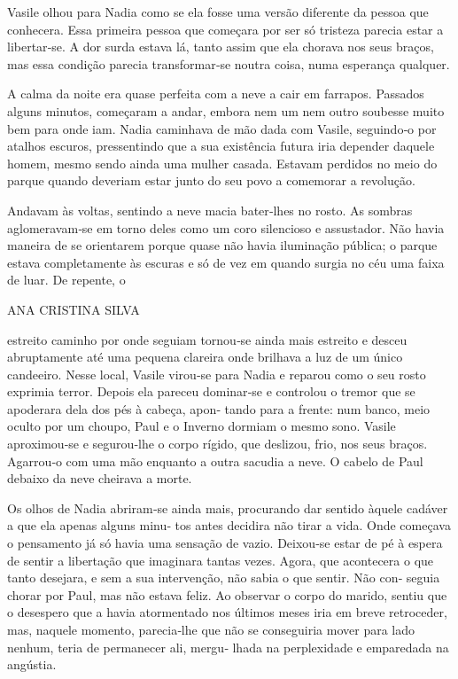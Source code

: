 Vasile olhou para Nadia como se ela fosse uma versão diferente da pessoa
que conhecera. Essa primeira pessoa que começara por ser só tristeza
parecia estar a libertar‑se. A dor surda estava lá, tanto assim que ela
chorava nos seus braços, mas essa condição parecia transformar‑se noutra
coisa, numa esperança qualquer.

A calma da noite era quase perfeita com a neve a cair em farrapos.
Passados alguns minutos, começaram a andar, embora nem um nem outro
soubesse muito bem para onde iam. Nadia caminhava de mão dada com
Vasile, seguindo‑o por atalhos escuros, pressentindo que a sua
existência futura iria depender daquele homem, mesmo sendo ainda uma
mulher casada. Estavam perdidos no meio do parque quando deveriam estar
junto do seu povo a comemorar a revolução.

Andavam às voltas, sentindo a neve macia bater‑lhes no rosto. As sombras
aglomeravam‑se em torno deles como um coro silencioso e assustador. Não
havia maneira de se orientarem porque quase não havia iluminação
pública; o parque estava completamente às escuras e só de vez em quando
surgia no céu uma faixa de luar. De repente, o

ANA CRISTINA SILVA

estreito caminho por onde seguiam tornou‑se ainda mais estreito e desceu
abruptamente até uma pequena clareira onde brilhava a luz de um único
candeeiro. Nesse local, Vasile virou‑se para Nadia e reparou como o seu
rosto exprimia terror. Depois ela pareceu dominar‑se e controlou o
tremor que se apoderara dela dos pés à cabeça, apon‑ tando para a
frente: num banco, meio oculto por um choupo, Paul e o Inverno dormiam o
mesmo sono. Vasile aproximou‑se e segurou‑lhe o corpo rígido, que
deslizou, frio, nos seus braços. Agarrou‑o com uma mão enquanto a outra
sacudia a neve. O cabelo de Paul debaixo da neve cheirava a morte.

Os olhos de Nadia abriram‑se ainda mais, procurando dar sentido àquele
cadáver a que ela apenas alguns minu‑ tos antes decidira não tirar a
vida. Onde começava o pensamento já só havia uma sensação de vazio.
Deixou‑se estar de pé à espera de sentir a libertação que imaginara
tantas vezes. Agora, que acontecera o que tanto desejara, e sem a sua
intervenção, não sabia o que sentir. Não con‑ seguia chorar por Paul,
mas não estava feliz. Ao observar o corpo do marido, sentiu que o
desespero que a havia atormentado nos últimos meses iria em breve
retroceder, mas, naquele momento, parecia‑lhe que não se conseguiria
mover para lado nenhum, teria de permanecer ali, mergu‑ lhada na
perplexidade e emparedada na angústia.

